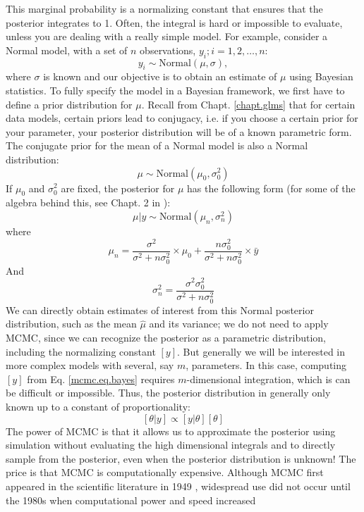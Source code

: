 This marginal probability is a normalizing constant that ensures that
the posterior integrates to 1. Often, the
integral is  hard or impossible to evaluate, unless you are
dealing with a really simple model.  For example, consider 
a Normal model, with a set of $n$ observations, $y_{i};
i=1,2,\ldots,n$: 
\[
 y_{i} \sim \mbox{Normal}(\mu, \sigma),
\]
where $\sigma$ is known and our objective is to obtain an estimate of
$\mu$ using Bayesian statistics. To fully specify the model in a Bayesian
framework, we first have to define a prior distribution for $\mu$. Recall
from Chapt. \ref{chapt.glms} 
that for certain data models, certain priors lead to
conjugacy, i.e. if you choose a certain prior for your parameter,
your posterior distribution will be of a known parametric form. The
conjugate prior for the mean of a Normal model is also a Normal
distribution:
\[
\mu \sim \mbox{Normal}(\mu_0, \sigma_{0}^{2})
\]
If $\mu_{0}$ and $\sigma_{0}^{2}$ are fixed, the posterior for $\mu$
has the following form (for some of the algebra behind this, see Chapt. 2 in \citet{gelman_etal:2004}):
\begin{equation}
\mu|y \sim \mbox{Normal}(\mu_{n}, \sigma_{n}^{2})
\label{mcmc.eq.mu-posterior}
\end{equation}
where
\[
\mu_{n} = \frac{ \sigma^{2}}  {\sigma^{2}   +n \sigma_{0}^{2}}\times  \mu_0 +      \frac{n  \sigma_{0}^{2}}  {\sigma^{2}   +n \sigma_{0}^{2}} \times\bar{y}
\]
And
\[
 \sigma_{n}^{2} = \frac{\sigma^{2}  \sigma_{0}^{2}} {\sigma^{2} + n \sigma_{0}^{2}}
\]
We can directly obtain estimates of interest from this Normal
posterior distribution, such as the mean $\hat{\mu}$ and its variance; we
do not need to apply MCMC, since we can recognize the posterior as a
parametric distribution, including the normalizing constant $[y]$.
But generally we will be interested in more complex models with
several, say $m$, parameters. In this case, computing $[y]$ from
Eq. \ref{mcmc.eq.bayes} requires $m$-dimensional integration, which is
can be difficult or impossible. Thus, the posterior distribution in
generally only known up to a constant of proportionality:
\[
[\theta|y] \propto [y|\theta]  [\theta]
\]
The power of MCMC is that it allows us to approximate the posterior
using simulation without evaluating the high dimensional integrals and
to directly sample from the posterior, even when the posterior
distribution is unknown! The price is that MCMC is computationally
expensive. Although MCMC first appeared in the scientific literature
in 1949 \citep{metropolis_etal:1949}, widespread use did not occur
until the 1980s when computational power and speed increased
